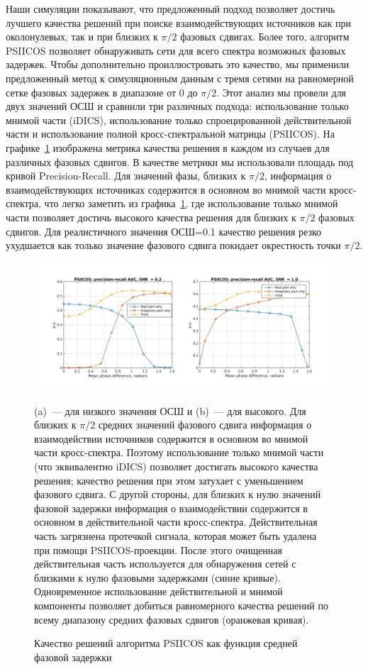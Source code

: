 Наши симуляции показывают, что предложенный подход позволяет достичь лучшего
качества решений при поиске взаимодействующих источников как при околонулевых,
так и при близких к $\pi/2$ фазовых сдвигах. Более того, алгоритм PSIICOS
позволяет обнаруживать сети для всего спектра возможных фазовых задержек. Чтобы
дополнительно проиллюстровать это качество, мы применили предложенный метод к
симуляционным данным с тремя сетями на равномерной сетке фазовых задержек в
диапазоне от 0 до $\pi/2$. Этот анализ мы провели для двух значений ОСШ и
сравнили три различных подхода: использование только мнимой части (iDICS),
использование только спроецированной действительной части и использование
полной кросс-спектральной матрицы (PSIICOS). На графике~\ref{fig:09}
изображена метрика качества решения в каждом из случаев для различных фазовых
сдвигов.  В качестве метрики мы использовали площадь под кривой
Precision-Recall. Для значений фазы, близких к $\pi/2$, информация о взаимодействующих
источниках содержится в основном во мнимой части кросс-спектра, что легко
заметить из графика~\ref{fig:09}, где использование только мнимой части позволяет достичь
высокого качества решения для близких к $\pi/2$ фазовых сдвигов. Для реалистичного
значения ОСШ=0.1 качество решения резко ухудшается как только значение фазового сдвига
покидает окрестность точки $\pi/2$.

\begin{figure}[!ht]
 \includegraphics[width=1\textwidth]{../images/psiicos_paper/Figure9_hr.jpg}
 \caption{Качество решений алгоритма PSIICOS как функция средней фазовой задержки}\label{fig:09}
     (a)~--- для низкого значения ОСШ и (b)~--- для высокого.
     Для близких к $\pi/2$ средних значений фазового сдвига информация
     о взаимодействии источников содержится в основном во мнимой части кросс-спектра.
     Поэтому использование только мнимой части (что эквивалентно iDICS) позволяет
     достигать высокого качества решения; качество решения при этом затухает
     с уменьшением фазового сдвига. С другой стороны, для близких к нулю
     значений фазовой задержки информация о взаимодействии содержится в основном
     в действительной части кросс-спектра. Действительная часть загрязнена
     протечкой сигнала, которая может быть удалена при помощи PSIICOS-проекции.
     После этого очищенная действительная часть используется для обнаружения
     сетей с близкими к нулю фазовыми задержками (синие кривые). Одновременное
     использование действительной и мнимой компоненты позволяет добиться равномерного
     качества решений по всему диапазону средних фазовых сдвигов (оранжевая кривая).
\end{figure}%

